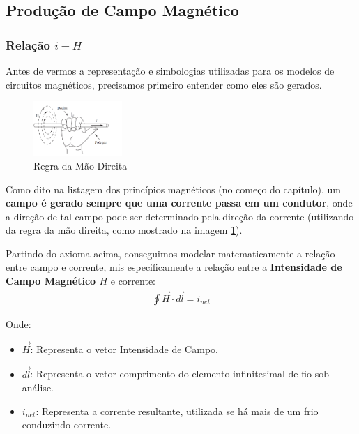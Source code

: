 \documentclass{article}
\begin{document}
\subsection{Produção de Campo Magnético}
\subsubsection{Relação $i-H$}

Antes de vermos a representação e simbologias utilizadas para os modelos de circuitos magnéticos, precisamos primeiro entender como eles são gerados.


\begin{figure}
    \centering
    \includegraphics[width=0.3\textwidth]{imgs/2023-08-15 10_18_18-1_CIRCUITOS_MAG.pdf - ET520 - Princípios de Conversão de Energia - Visual Studio.png}
    \caption{Regra da Mão Direita}
    \label{img:regra_da_mao_direita}
\end{figure}

Como dito na listagem dos princípios magnéticos (no começo do capítulo), um \textbf{campo é gerado sempre que uma corrente passa em um condutor}, onde a direção de tal campo pode ser determinado pela direção da corrente (utilizando da regra da mão direita, como mostrado na imagem \ref{img:regra_da_mao_direita}).

Partindo do axioma acima, conseguimos modelar matematicamente a relação entre campo e corrente, mis especificamente a relação entre a \textbf{Intensidade de Campo Magnético $H$} e corrente:
\begin{align}
    \oint \vec H \cdot \vec{dl} = i_{net}
\end{align}

Onde:
\begin{itemize}
    \item $\vec H$: Representa o vetor Intensidade de Campo.
    \item $\vec{dl}$: Representa o vetor comprimento do elemento infinitesimal de fio sob análise.
    \item $i_{net}$: Representa a corrente resultante, utilizada se há mais de um frio conduzindo corrente. 
\end{itemize}
\end{document}
